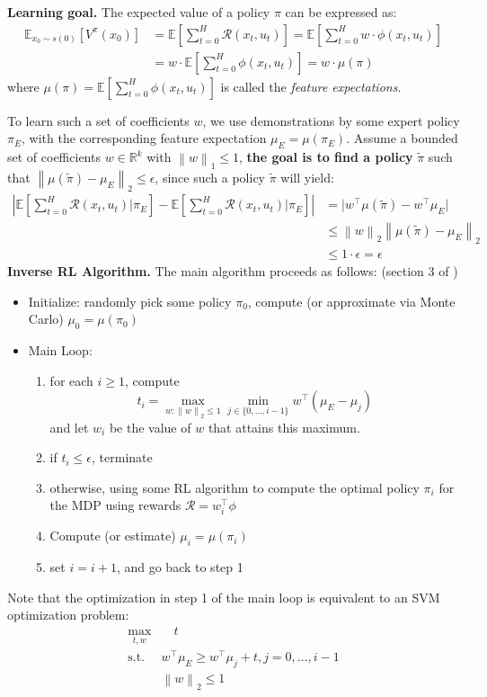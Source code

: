 \documentclass[a4paper]{article}
\newcommand{\abs}[1]{\lvert#1\rvert}
\newcommand{\norm}[1]{\left\|#1\right\|}
\begin{document}
\textbf{Learning goal.} The expected value of a policy $\pi$ can be expressed as:
\begin{align}
\mathbb{E}_{x_0\sim s(0)}\left[V^\pi(x_0)\right] &= \mathbb{E}\left[ \sum_{t=0}^H \mathcal{R}(x_t, u_t) \right] = \mathbb{E}\left[\sum_{t=0}^H w\cdot\phi(x_t,u_t)\right] \\
&= w\cdot \mathbb{E}\left[\sum_{t=0}^H \phi(x_t,u_t)\right] = w\cdot\mu(\pi)
\end{align}
where $\mu(\pi) = \mathbb{E}\left[\sum_{t=0}^H\phi(x_t,u_t)\right]$ is called the \textit{feature expectations}.

To learn such a set of coefficients $w$, we use demonstrations by some expert policy $\pi_{E}$, with the corresponding feature expectation $\mu_E = \mu(\pi_E)$. Assume a bounded set of coefficients $w\in\mathbb{R}^k$ with $\norm{w}_1\leq 1$, \textbf{the goal is to find a policy} $\tilde{\pi}$ such that $\norm{\mu(\tilde{\pi}) -\mu_E}_2\leq\epsilon$, since such a policy $\tilde{\pi}$ will yield:
\begin{align}
\left|\mathbb{E}\left[\sum_{t=0}^{H}\mathcal{R}(x_t,u_t) | \pi_E\right]-\mathbb{E}\left[\sum_{t=0}^{H}\mathcal{R}(x_t,u_t) | \pi_E\right]\right| &= \abs{w^\intercal\mu(\tilde{\pi}) -w^\intercal\mu_E} \\
&\leq \norm{w}_2 \norm{\mu(\tilde{\pi})-\mu_E}_2 \\
&\leq 1\cdot\epsilon = \epsilon
\end{align}
\textbf{Inverse RL Algorithm.} The main algorithm proceeds as follows: (section 3 of \cite{abbeel2004apprenticeship})
\begin{itemize}
\item Initialize: randomly pick some policy $\pi_0$, compute (or approximate via Monte Carlo) $\mu_0 = \mu(\pi_0)$
\item Main Loop: 
\begin{enumerate}
\item for each $i\geq1$, compute 
\begin{equation}
t_i=\max_{w:\norm{w}_2\leq 1}\min_{j\in\{0,\ldots,i-1\}}w^\intercal(\mu_E-\mu_j) 
\end{equation}
and let $w_i$ be the value of $w$ that attains this maximum.
\item if $t_i\leq\epsilon$, terminate
\item otherwise, using some RL algorithm to compute the optimal policy $\pi_i$ for the MDP using rewards $\mathcal{R} = w_i^\intercal\phi$
\item Compute (or estimate) $\mu_i = \mu(\pi_i)$
\item set $i=i+1$, and go back to step 1
\end{enumerate}
\end{itemize}
Note that the optimization in step 1 of the main loop is equivalent to an SVM optimization problem:
\begin{align}
\max_{t,w} &\quad t \\
\text{s.t. } & w^\intercal\mu_E \geq w^\intercal\mu_j + t, j = 0,\ldots,i-1 \\
&\norm{w}_2\leq 1
\end{align}
\end{document}
